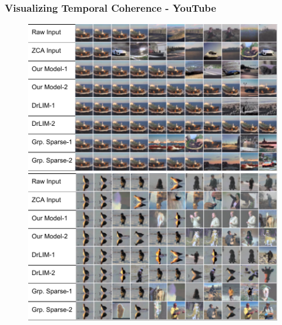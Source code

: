 \documentclass{beamer}
\begin{document}
\begin{frame}
\frametitle{Visualizing Temporal Coherence - YouTube}
\begin{center} 
\begin{figure}
\includegraphics[scale=0.40]{./Figures/Project1/NNtime1.pdf}\\ \vspace{0.25cm} 
\includegraphics[scale=0.40]{./Figures/Project1/NNtime2.pdf}
\end{figure}
\end{center}  
\end{frame} 
\end{document}
